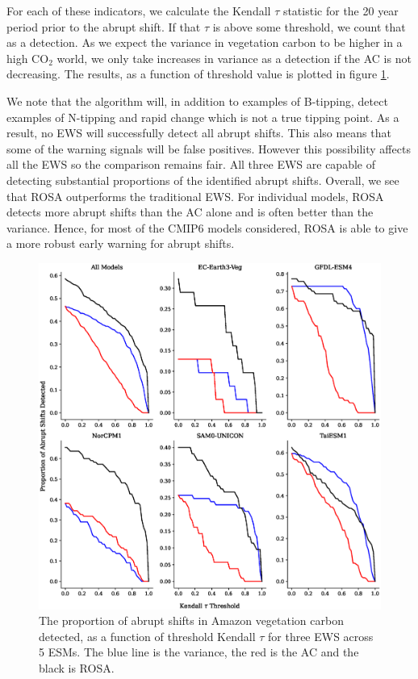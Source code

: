 For each of these indicators, we calculate the Kendall $\tau$ statistic for the
20 year period prior to the abrupt shift. If that $\tau$ is above some threshold, we 
count that as a detection. As we expect the variance in vegetation carbon to be higher 
in a high CO$_2$ world, we only take increases in variance as a detection if
the AC is not decreasing. The results, as a function of threshold value
is plotted in figure \cref{fig:complex_test}.

We note that the algorithm will, in addition to examples of B-tipping, detect examples
of N-tipping and rapid change which is not a true tipping point. As a result, no 
EWS will successfully detect all abrupt shifts. This also means that some
of the warning signals will be false positives. However this possibility
affects all the EWS so the comparison remains fair. All three EWS are capable
of detecting substantial proportions of the identified abrupt shifts. Overall, we see that ROSA outperforms the traditional EWS. For individual models,
ROSA detects more abrupt shifts than the AC alone and is often better than the 
variance. Hence, for most of the CMIP6 models considered, ROSA is able to give a more robust
early warning for abrupt shifts.

\begin{figure}
\includegraphics[scale=0.6,keepaspectratio]{figure4.eps}
\caption{The proportion of abrupt shifts in Amazon vegetation carbon
detected, as a function of threshold Kendall $\tau$ for three EWS across 5 ESMs. The blue line is the variance,
the red is the AC and the black is ROSA.}
\label{fig:complex_test}
\end{figure}



